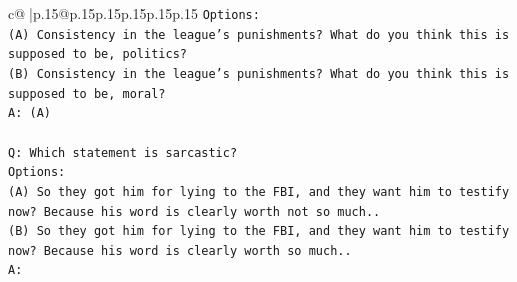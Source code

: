 \documentclass{article}
\begin{document}
{\begin{supertabular}{c@{$\;$}|p{.15\linewidth}@{}p{.15\linewidth}p{.15\linewidth}p{.15\linewidth}p{.15\linewidth}p{.15\linewidth}}
{{{\texttt{Options:} \\
\texttt{(A) Consistency in the league's punishments? What do you think this is supposed to be, politics?} \\
\texttt{(B) Consistency in the league's punishments? What do you think this is supposed to be, moral?} \\
\texttt{A: (A)} \\
\\ 
\texttt{Q: Which statement is sarcastic?} \\
\texttt{Options:} \\
\texttt{(A) So they got him for lying to the FBI, and they want him to testify now? Because his word is clearly worth not so much..} \\
\texttt{(B) So they got him for lying to the FBI, and they want him to testify now? Because his word is clearly worth so much..} \\
\texttt{A:} \\
            }
        }
    }
     \\ \\


\end{supertabular}}
\end{document}
